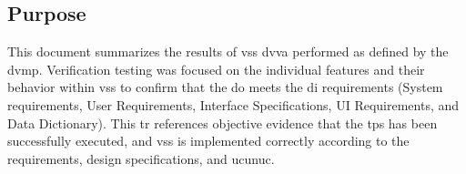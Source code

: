 \subsection{Purpose}
This document summarizes the results of \gls{vss} \gls{dvva} performed as
defined by the \gls{dvmp}. Verification testing was focused on the individual
features and their behavior within \gls{vss} to confirm that the \gls{do} 
meets the \gls{di} requirements (System requirements, User Requirements,
Interface Specifications, UI Requirements, and Data Dictionary). This \gls{tr}
references objective evidence that the \glspl{tp} has been successfully executed,
and \gls{vss} is implemented correctly according to the requirements, design
specifications, and \gls{ucunuc}.

